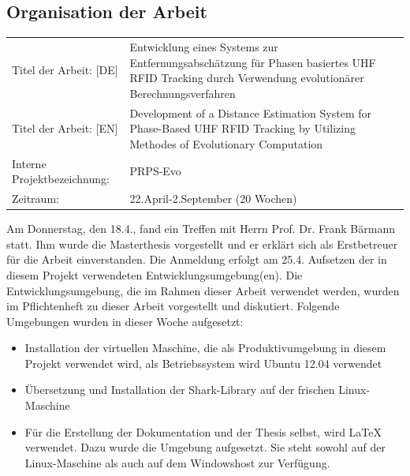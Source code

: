\documentclass[a4paper,12pt,fleqn]{scrartcl}
\begin{document}
\subsection{Organisation der Arbeit}
\begin{table}[right]
    \renewcommand{\arraystretch}{1.5}
    \begin{tabular}{lp{11cm}}
      Titel der Arbeit:  [DE] & Entwicklung eines Systems zur
Entfernungsabschätzung für Phasen basiertes UHF RFID Tracking durch Verwendung
evolutionärer Berechnungsverfahren \\
      Titel der Arbeit:  [EN] & Development of a Distance Estimation System for
Phase-Based UHF RFID Tracking by Utilizing Methodes of Evolutionary Computation
\\
      Interne Projektbezeichnung: & PRPS-Evo      \\
      Zeitraum: & 22.April-2.September (20 Wochen)
    \end{tabular}
\end{table}
%
Am Donnerstag, den 18.4., fand ein Treffen mit Herrn Prof.
Dr. Frank Bärmann statt. Ihm wurde die Masterthesis vorgestellt und er erklärt
sich als Erstbetreuer für die Arbeit einverstanden.
\newline
%
Die Anmeldung erfolgt am 25.4.
\newline
%
Aufsetzen der in diesem Projekt verwendeten Entwicklungsumgebung(en). Die
Entwicklungsumgebung, die im Rahmen dieser Arbeit verwendet werden, wurden im
Pflichtenheft zu dieser Arbeit vorgestellt und diskutiert.
\newline
%
Folgende Umgebungen wurden in dieser Woche aufgesetzt:
\begin{itemize}
  \item Installation der virtuellen Maschine, die als Produktivumgebung in
diesem
Projekt verwendet wird, als Betriebssystem wird Ubuntu 12.04 verwendet
  \item Übersetzung und Installation der Shark-Library auf der frischen
  Linux-Maschine
  \item Für die Erstellung der Dokumentation und der Thesis selbst, wird
\LaTeX{} verwendet.
  Dazu wurde die Umgebung aufgesetzt. Sie steht sowohl auf der Linux-Maschine
als auch auf dem Windowshost zur Verfügung.
\end{itemize}

\end{document}
